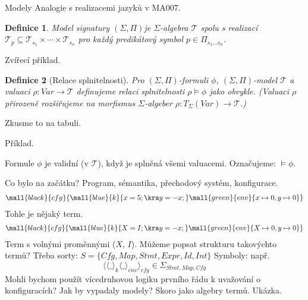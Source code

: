 \documentclass[11pt]{beamer}
\newtheorem{dfn}{Definice}
\newtheorem{pozn}{Poznámka}
\newcommand{\Var}{\mathit{Var}}
\begin{document}
\newcommand{\folSignature}{$\left( \Sigma, \Pi \right)$}

\begin{frame}{Modely}
Analogie s realizacemi jazyků v MA007.
\begin{dfn}
Model signatury \folSignature je $\Sigma$-algebra $\mathcal{T}$ spolu s realizací $\mathcal{T}_p \subseteq \mathcal{T}_{s_1} \times \cdots \times \mathcal{T}_{s_n} $ pro každý predikátový symbol $p \in \Pi_{s_1 \ldots s_n}$.
\end{dfn}

\pause
Zvířecí příklad.
\pause

\begin{dfn}[Relace splnitelnosti]
Pro \folSignature -formuli $\phi$, \folSignature -model $\mathcal{T}$ a valuaci $\rho : \Var \rightarrow \mathcal{T}$ definujeme relaci splnitelnosti $\rho \models \phi$ jako obvykle. (Valuaci $\rho$ přirozeně rozšiřujeme na morfismus $\Sigma$-algeber $\rho : T_{\Sigma}\left( Var \right) \rightarrow \mathcal{T}$.)
\end{dfn}
\pause

Zkusme to na tabuli.

\pause

Příklad.

\pause

Formule $\phi$ je validní (v $\mathcal{T}$), když je splněná všemi valuacemi. Označujeme: $\models \phi$.

%
%

\end{frame}
%

\begin{frame}
Co bylo na začátku? \pause Program, sémantika, přechodový systém, konfigurace.
\pause
\begin{multline*}
\mall{black}{cfg}{\mall{blue}{k}{x=5; \kra y=-x; } \mall{green}{env}{x \mapsto 0,y \mapsto 0}}
\end{multline*}
\pause
Tohle je nějaký term.
\pause
\begin{multline*}
\mall{black}{cfg}{\mall{blue}{k}{X=I; \kra y=-x; } \mall{green}{env}{X \mapsto 0,y \mapsto 0}}
\end{multline*}
\pause
Term s volnými proměnnými ($X$, $I$).
\pause
Můžeme popsat strukturu takovýchto termů?
\pause
Třeba sorty:
$S = \lbrace \mathit{Cfg} , \mathit{Map}, \mathit{Stmt}, \mathit{Expr}, \mathit{Id}, \mathit{Int} \rbrace $
\pause
Symboly:
\pause
např. 
\begin{equation*}
\langle \langle \_ \rangle_{k} \langle \_ \rangle_{env} \rangle_{cfg} \in \Sigma_{\mathit{Stmt}, \mathit{Map}, \mathit{Cfg} }
\end{equation*}
\pause
Mohli bychom použít vícedruhovou logiku prvního řádu k uvažování o konfiguracích?
\pause
Jak by vypadaly modely?
\pause
Skoro jako algebry termů. Ukázka.

\end{frame}
\end{document}
